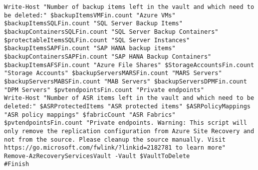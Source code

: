 \begin{verbatim}
Write-Host "Number of backup items left in the vault and which need to be deleted:" $backupItemsVMFin.count "Azure VMs" $backupItemsSQLFin.count "SQL Server Backup Items" $backupContainersSQLFin.count "SQL Server Backup Containers" $protectableItemsSQLFin.count "SQL Server Instances" $backupItemsSAPFin.count "SAP HANA backup items" $backupContainersSAPFin.count "SAP HANA Backup Containers" $backupItemsAFSFin.count "Azure File Shares" $StorageAccountsFin.count "Storage Accounts" $backupServersMARSFin.count "MARS Servers" $backupServersMABSFin.count "MAB Servers" $backupServersDPMFin.count "DPM Servers" $pvtendpointsFin.count "Private endpoints"
Write-Host "Number of ASR items left in the vault and which need to be deleted:" $ASRProtectedItems "ASR protected items" $ASRPolicyMappings "ASR policy mappings" $fabricCount "ASR Fabrics" $pvtendpointsFin.count "Private endpoints. Warning: This script will only remove the replication configuration from Azure Site Recovery and not from the source. Please cleanup the source manually. Visit https://go.microsoft.com/fwlink/?linkid=2182781 to learn more"
Remove-AzRecoveryServicesVault -Vault $VaultToDelete
#Finish
\end{verbatim}

